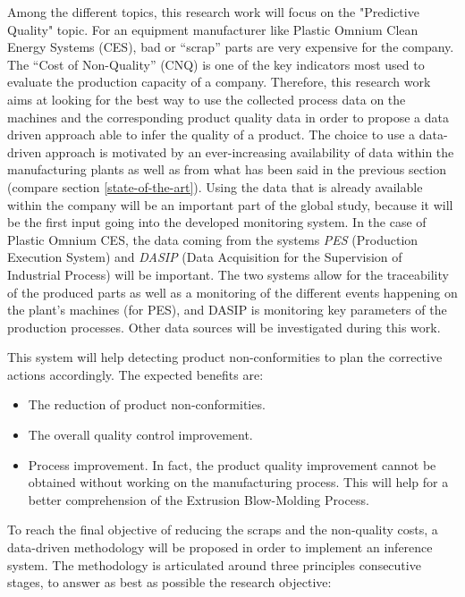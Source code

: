 %
Among the different topics, this research work will focus on the "Predictive Quality" topic. For an equipment manufacturer like Plastic Omnium Clean Energy Systems (CES), bad or ``scrap'' parts are very expensive for the company. The “Cost of Non-Quality” (CNQ) is one of the key indicators most used to evaluate the production capacity of a company. Therefore, this research work aims at looking for the best way to use the collected process data on the machines and the corresponding product quality data in order to propose a data driven approach able to infer the quality of a product. The choice to use a data-driven approach is motivated by an ever-increasing availability of data within the manufacturing plants as well as from what has been said in the previous section (compare section \ref{state-of-the-art}). Using the data that is already available within the company will be an important part of the global study, because it will be the first input going into the developed monitoring system. In the case of Plastic Omnium CES, the data coming from the systems \textit{PES} (Production Execution System) and \textit{DASIP} (Data Acquisition for the Supervision of Industrial Process) will be important. The two systems allow for the traceability of the produced parts as well as a monitoring of the different events happening on the plant’s machines (for PES), and DASIP is monitoring key parameters of the production processes. Other data sources will be investigated during this work.

This system will help detecting product non-conformities to plan the corrective actions accordingly. The expected benefits are:

\begin{itemize}
    \item The reduction of product non-conformities. 
    \item The overall quality control improvement.
    \item Process improvement. In fact, the product quality improvement cannot be obtained without working on the manufacturing process. This will help for a better comprehension of the Extrusion Blow-Molding Process. 
\end{itemize}

To reach the final objective of reducing the scraps and the non-quality costs, a data-driven methodology will be proposed in order to implement an inference system. The methodology is articulated around three principles consecutive stages, to answer as best as possible the research objective:

